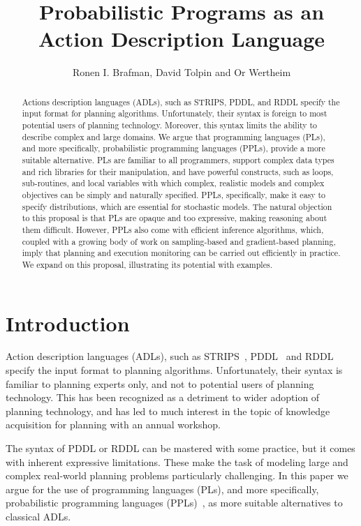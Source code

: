 \documentclass[letterpaper]{article} %
\title{Probabilistic Programs as an Action Description Language}
\author{Ronen I. Brafman, David Tolpin and Or Wertheim}
\theoremstyle{definition}
\begin{document}
\maketitle

\begin{abstract}
Actions description languages (ADLs), such as STRIPS, PDDL, and RDDL specify the input format for planning algorithms. Unfortunately, their syntax is foreign to most potential users of planning technology. Moreover, this syntax  limits the ability to describe complex and large domains. We argue that programming languages (PLs), and more specifically, probabilistic programming languages (PPLs), provide a more suitable alternative. PLs are familiar to all programmers, support complex data types and rich libraries for their manipulation, and have powerful constructs, such as loops, sub-routines, and local variables with which complex, realistic models and complex objectives can be simply and naturally specified. PPLs, specifically, make it easy to specify distributions, which are essential for stochastic models. The natural objection to this proposal is that PLs are opaque and too expressive, making reasoning about them difficult. However, PPLs also come with efficient inference algorithms, which, coupled with a growing body of work on sampling-based and gradient-based planning, imply that planning and execution monitoring can be carried out efficiently in practice. We expand on this proposal, illustrating its potential with  examples. 
\end{abstract}

\section{Introduction}
Action description languages (ADLs), such as STRIPS~\cite{STRIPS}, PDDL~\cite{PDDL} and  RDDL~\cite{RDDL} specify the input format to planning algorithms. Unfortunately, their syntax is familiar to planning experts only, and not to potential users of planning technology. This has been recognized as a detriment to wider adoption of planning technology, and has led to much interest in the topic of knowledge acquisition for planning with an annual workshop. 

The syntax of PDDL or RDDL can be mastered with some practice, but it comes with inherent expressive limitations. 
These make the task of modeling large and complex real-world planning problems particularly challenging. 
In this paper we argue for the use of
programming languages (PLs), and more specifically, probabilistic programming languages (PPLs)~\cite{GMR+08,MSP14,WVM14,GS15}, as more suitable alternatives to classical ADLs. 
\end{document}
